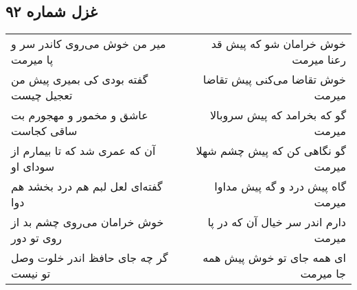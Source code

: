 \begin{center}
\section*{غزل شماره ۹۲}
\label{sec:sh092}
\begin{longtable}{l p{0.5cm} r}
میر من خوش می‌روی کاندر سر و پا میرمت
&&
خوش خرامان شو که پیش قد رعنا میرمت
\\
گفته بودی کی بمیری پیش من تعجیل چیست
&&
خوش تقاضا می‌کنی پیش تقاضا میرمت
\\
عاشق و مخمور و مهجورم بت ساقی کجاست
&&
گو که بخرامد که پیش سروبالا میرمت
\\
آن که عمری شد که تا بیمارم از سودای او
&&
گو نگاهی کن که پیش چشم شهلا میرمت
\\
گفته‌ای لعل لبم هم درد بخشد هم دوا
&&
گاه پیش درد و گه پیش مداوا میرمت
\\
خوش خرامان می‌روی چشم بد از روی تو دور
&&
دارم اندر سر خیال آن که در پا میرمت
\\
گر چه جای حافظ اندر خلوت وصل تو نیست
&&
ای همه جای تو خوش پیش همه جا میرمت
\\
\end{longtable}
\end{center}
